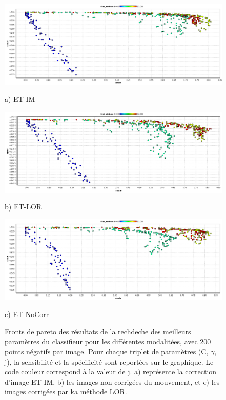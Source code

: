 \begin{figure}[h!]

\begin{center}
 \includegraphics[width=14cm]{images/pareto_mod_IM.png}

{\small a) ET-IM}
\vspace{0.5cm}

\includegraphics[width=14cm]{images/pareto_mod_LOR.png}
 
{\small b) ET-LOR}
\vspace{0.5cm}

\includegraphics[width=14cm]{images/pareto_mod_NoCorr.png}

{\small c) ET-NoCorr}

\end{center}
 \caption{\label{fig:paretoModalite} Fronts de pareto des résultats de la rechdeche des meilleurs paramètres du classifieur pour les différentes modalitées, avec 200 points négatifs par image. Pour chaque triplet de paramètres (C, $\gamma$, j), la sensibilité et la spécificité sont reportées sur le graphique. Le code couleur correspond à la valeur de j. a) représente la correction d'image ET-IM, b) les images non corrigées du mouvement, et c) les images corrigées par ka méthode LOR.}
\end{figure}








